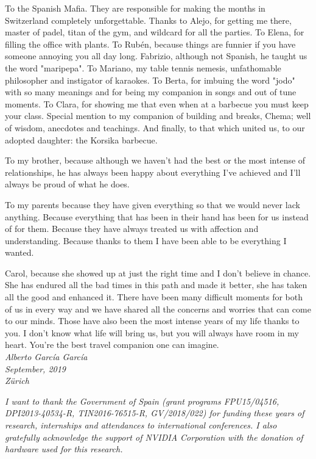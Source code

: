 To the Spanish Mafia. They are responsible for making the months in Switzerland completely unforgettable. Thanks to Alejo, for getting me there, master of padel, titan of the gym, and wildcard for all the parties. To Elena, for filling the office with plants. To Rubén, because things are funnier if you have someone annoying you all day long. Fabrizio, although not Spanish, he taught us the word "maripepa". To Mariano, my table tennis nemesis, unfathomable philosopher and instigator of karaokes. To Berta, for imbuing the word "jodo" with so many meanings and for being my companion in songs and out of tune moments. To Clara, for showing me that even when at a barbecue you must keep your class. Special mention to my companion of building and breaks, Chema; well of wisdom, anecdotes and teachings. And finally, to that which united us, to our adopted daughter: the Korsika barbecue.

To my brother, because although we haven't had the best or the most intense of relationships, he has always been happy about everything I've achieved and I'll always be proud of what he does.

To my parents because they have given everything so that we would never lack anything. Because everything that has been in their hand has been for us instead of for them. Because they have always treated us with affection and understanding. Because thanks to them I have been able to be everything I wanted.

Carol, because she showed up at just the right time and I don't believe in chance. She has endured all the bad times in this path and made it better, she has taken all the good and enhanced it. There have been many difficult moments for both of us in every way and we have shared all the concerns and worries that can come to our minds. Those have also been the most intense years of my life thanks to you. I don't know what life will bring us, but you will always have room in my heart. You're the best travel companion one can imagine.\\

\noindent\emph{Alberto García García}\\
\emph{September, 2019}\\
\emph{Zürich}\\

\vfill

\emph{I want to thank the Government of Spain (grant programs FPU15/04516, DPI2013-40534-R, TIN2016-76515-R, GV/2018/022) for funding these years of research, internships and attendances to international conferences. I also gratefully acknowledge the support of NVIDIA Corporation with the donation of hardware used for this research.}\\


